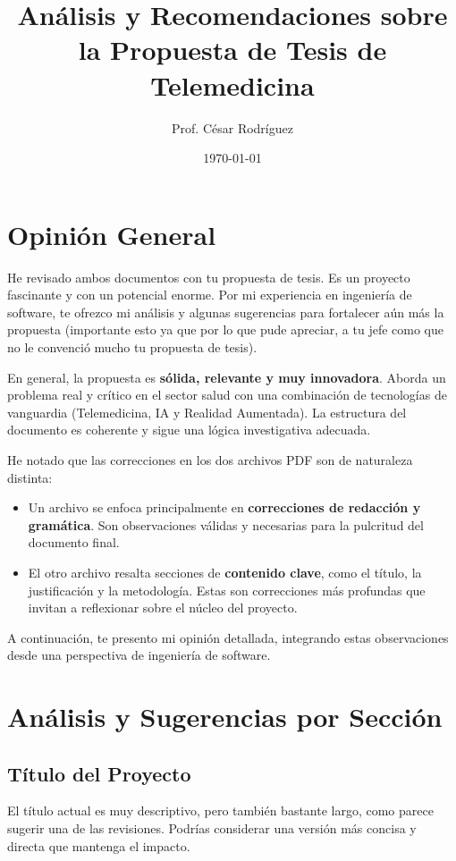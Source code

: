 \documentclass[12pt,a4paper]{article}
\title{Análisis y Recomendaciones sobre la Propuesta de Tesis de Telemedicina}
\author{Prof. César Rodríguez}
\date{\today}
\begin{document}
\maketitle

\section{Opinión General}

He revisado ambos documentos con tu propuesta de tesis. Es un proyecto fascinante y con un potencial 
enorme. Por mi experiencia en ingeniería de software, te ofrezco mi análisis y algunas sugerencias 
para fortalecer aún más la propuesta (importante esto ya que por lo que pude apreciar, a tu jefe como 
que no le convenció mucho tu propuesta de tesis).

En general, la propuesta es \textbf{sólida, relevante y muy innovadora}. Aborda un problema real 
y crítico en el sector salud con una combinación de tecnologías de vanguardia (Telemedicina, IA y 
Realidad Aumentada). La estructura del documento es coherente y sigue una lógica investigativa 
adecuada.

He notado que las correcciones en los dos archivos PDF son de naturaleza distinta:
\begin{itemize}
    \item Un archivo se enfoca principalmente en \textbf{correcciones de redacción y gramática}. 
    Son observaciones válidas y necesarias para la pulcritud del documento final.
    \item El otro archivo resalta secciones de \textbf{contenido clave}, como el título, la justificación 
    y la metodología. Estas son correcciones más profundas que invitan a reflexionar sobre el núcleo 
    del proyecto.
\end{itemize}

A continuación, te presento mi opinión detallada, integrando estas observaciones desde una perspectiva 
de ingeniería de software.

\section{Análisis y Sugerencias por Sección}

\subsection{Título del Proyecto}
El título actual es muy descriptivo, pero también bastante largo, como parece sugerir una de las 
revisiones. Podrías considerar una versión más concisa y directa que mantenga el impacto.
\end{document}
